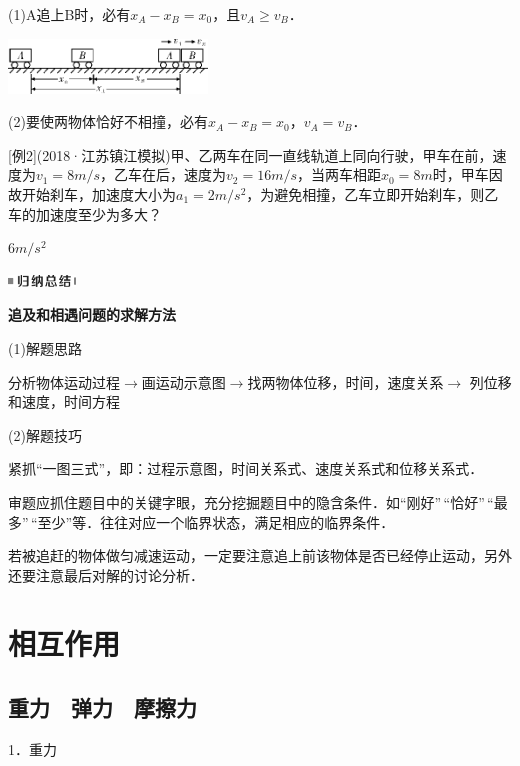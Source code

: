 \documentclass[cn,10.5pt,chinese,mac,chinesefont=founder]{elegantbook}
\begin{document}
(1)A追上B时，必有$x_A-x_B=x_0$，且$v_A\ge v_B$．

\begin{center}\includegraphics[width=2.08333in,height=0.57292in]{media/image35.png}\end{center}

(2)要使两物体恰好不相撞，必有$x_A-x_B=x_0$，$v_A=v_B$．

{[}例2{]}(2018·江苏镇江模拟)甲、乙两车在同一直线轨道上同向行驶，甲车在前，速度为$v_1=8m/s$，乙车在后，速度为$v_2=16 m/s$，当两车相距$x_0=8m$时，甲车因故开始刹车，加速度大小为$a_1=2m/s^2$，为避免相撞，乙车立即开始刹车，则乙车的加速度至少为多大？
\begin{solution}
	$6m/s^2$
\end{solution}


\begin{center}\includegraphics[width=0.70833in,height=0.125in]{media/image13.png}

\textbf{追及和相遇问题的求解方法}
\end{center}


(1)解题思路

分析物体运动过程$\rightarrow$画运动示意图$\rightarrow$找两物体位移，时间，速度关系$\rightarrow$ 列位移和速度，时间方程

(2)解题技巧

紧抓``一图三式''，即：过程示意图，时间关系式、速度关系式和位移关系式．

审题应抓住题目中的关键字眼，充分挖掘题目中的隐含条件．如``刚好''\,``恰好''\,``最多''\,``至少''等．往往对应一个临界状态，满足相应的临界条件．

若被追赶的物体做匀减速运动，一定要注意追上前该物体是否已经停止运动，另外还要注意最后对解的讨论分析．
\newpage
\chapter{相互作用}

\section{重力　弹力　摩擦力}


1．重力
\end{document}
